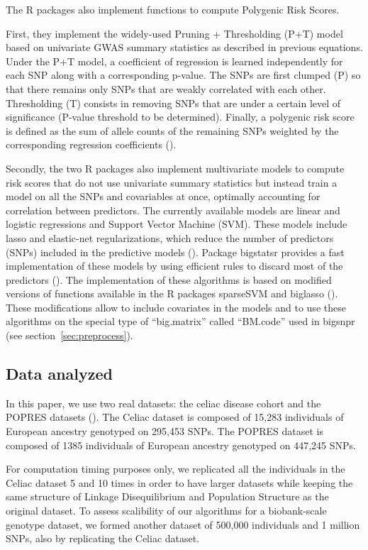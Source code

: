 \documentclass{bioinfo}
\begin{document}
\begin{methods}
The R packages also implement functions to compute Polygenic Risk Scores. 

First, they implement the widely-used Pruning + Thresholding (P+T) model based on univariate GWAS summary statistics as described in previous equations. Under the P+T model, a coefficient of regression is learned independently for each SNP along with a corresponding p-value. The SNPs are first clumped (P) so that there remains only SNPs that are weakly correlated with each other. Thresholding (T) consists in removing SNPs that are under a certain level of significance (P-value threshold to be determined). Finally, a polygenic risk score is defined as the sum of allele counts of the remaining SNPs weighted by the corresponding regression coefficients (\cite{Dudbridge2013,Chatterjee2013,Golan2014}). 

Secondly, the two R packages also implement multivariate models to compute risk scores that do not use univariate summary statistics but instead train a model on all the SNPs and covariables at once, optimally accounting for correlation between predictors. The currently available models are linear and logistic regressions and Support Vector Machine (SVM). These models include lasso and elastic-net regularizations, which reduce the number of  predictors (SNPs) included in the predictive models (\cite{Tibshirani1996,Zou2005,Friedman2010}). Package bigstatsr provides a fast implementation of these models by using efficient rules to discard most of the predictors (\cite{Tibshirani2012}). The implementation of these algorithms is based on modified versions of functions available in the R packages sparseSVM and biglasso (\cite{Zeng2017}). These modifications allow to include covariates in the models and to use these algorithms on the special type of ``big.matrix'' called ``BM.code'' used in bigsnpr (see section~\ref{sec:preprocess}).

\subsection{Data analyzed}

In this paper, we use two real datasets: the celiac disease cohort and the POPRES datasets (\cite{Dubois2010,Nelson2008}). The Celiac dataset is composed of 15,283 individuals of European ancestry genotyped on 295,453 SNPs. The POPRES dataset is composed of 1385 individuals of European ancestry genotyped on 447,245 SNPs.

For computation timing purposes only, we replicated all the individuals in the Celiac dataset 5 and 10 times in order to have larger datasets while keeping the same structure of Linkage Disequilibrium and Population Structure as the original dataset. To assess scalibility of our algorithms for a biobank-scale genotype dataset, we formed another dataset of 500,000 individuals and 1 million SNPs, also by replicating the Celiac dataset.

\end{methods}
\end{document}
